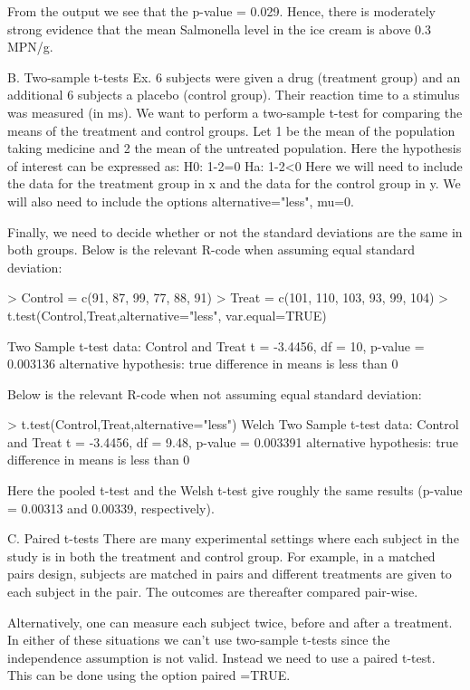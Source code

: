 From the output we see that the p-value = 0.029. Hence, there is moderately strong evidence that the mean Salmonella level in the ice cream is above 0.3 MPN/g.





B. Two-sample t-tests
Ex. 6 subjects were given a drug (treatment group) and an additional 6 subjects a placebo (control group). Their reaction time to a stimulus was measured (in ms). We want to perform a two-sample t-test for comparing the means of the treatment and control groups.
Let 1 be the mean of the population taking medicine and 2 the mean of the untreated population. Here the hypothesis of interest can be expressed as:
H0: 1-2=0
Ha: 1-2<0
Here we will need to include the data for the treatment group in x and the data for the control group in y. We will also need to include the options alternative="less", mu=0.

Finally, we need to decide whether or not the standard deviations are the same in both groups.
Below is the relevant R-code when assuming equal standard deviation:

> Control = c(91, 87, 99, 77, 88, 91)
> Treat = c(101, 110, 103, 93, 99, 104)
> t.test(Control,Treat,alternative="less", var.equal=TRUE)


Two Sample t-test
data: Control and Treat
t = -3.4456, df = 10, p-value = 0.003136
alternative hypothesis: true difference in means is less than 0


Below is the relevant R-code when not assuming equal standard deviation:

> t.test(Control,Treat,alternative="less")
Welch Two Sample t-test
data: Control and Treat
t = -3.4456, df = 9.48, p-value = 0.003391
alternative hypothesis: true difference in means is less than 0


Here the pooled t-test and the Welsh t-test give roughly the same results (p-value = 0.00313 and 0.00339, respectively).


C. Paired t-tests
There are many experimental settings where each subject in the study is in both the treatment and control group. For example, in a matched pairs design, subjects are matched in pairs and different treatments are given to each subject in the pair. The outcomes are thereafter compared pair-wise. 

Alternatively, one can measure each subject twice, before and after a treatment. In either of these situations we can’t use two-sample t-tests since the independence assumption is not valid. Instead we need to use a paired t-test. This can be done using the option paired =TRUE.

